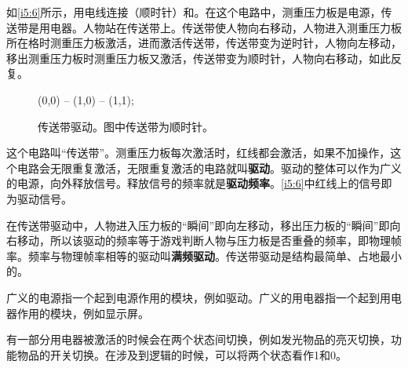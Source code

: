 \begin{example}{}{}\label{exa:conveyorEngine}

  如\autoref{i5:6}所示，用电线连接（顺时针）和。在这个电路中，测重压力板是电源，传送带是用电器。人物站在传送带上。传送带使人物向右移动，人物进入测重压力板所在格时测重压力板激活，进而激活传送带，传送带变为逆时针，人物向左移动，移出测重压力板时测重压力板又激活，传送带变为顺时针，人物向右移动，如此反复。
  \begin{figure}[H]
    \centering
    \begin{tikzpictureC}[TRsch]

       (0,0) -- (1,0) -- (1,1);
    \end{tikzpictureC}
    \caption{传送带驱动。图中传送带为顺时针。}
    \label{i5:6}
  \end{figure}

  这个电路叫“传送带”。测重压力板每次激活时，红线都会激活，如果不加操作，这个电路会无限重复激活，无限重复激活的电路就叫\textbf{驱动}。驱动的整体可以作为广义的电源，向外释放信号。释放信号的频率就是\textbf{驱动频率}。\autoref{i5:6}中红线上的信号即为驱动信号。

  在传送带驱动中，人物进入压力板的“瞬间”即向左移动，移出压力板的“瞬间”即向右移动，所以该驱动的频率等于游戏判断人物与压力板是否重叠的频率，即物理帧率。频率与物理帧率相等的驱动叫\textbf{满频驱动}。传送带驱动是结构最简单、占地最小的。
\end{example}

广义的电源指一个起到电源作用的模块，例如驱动。广义的用电器指一个起到用电器作用的模块，例如显示屏。

有一部分用电器被激活的时候会在两个状态间切换，例如发光物品的亮灭切换，功能物品的开关切换。在涉及到逻辑的时候，可以将两个状态看作1和0。

